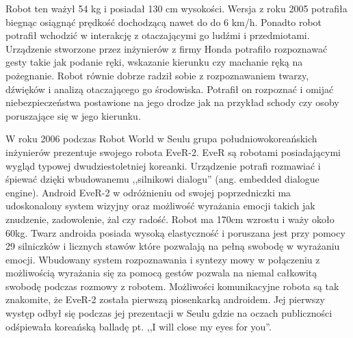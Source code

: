 Robot ten ważył 54 kg i posiadał 130 cm wysokości. Wersja z roku 2005 potrafiła
biegnąc osiągnąć prędkość dochodzącą nawet do do 6 km/h. Ponadto robot potrafił
wchodzić w interakcję z otaczającymi go ludźmi i przedmiotami. Urządzenie
stworzone przez inżynierów z firmy Honda potrafiło rozpoznawać gesty takie jak
podanie ręki, wskazanie kierunku czy machanie ręką na pożegnanie. Robot równie
dobrze radził sobie z rozpoznawaniem twarzy, dźwięków i analizą otaczającego go
środowiska. Potrafił on rozpoznać i omijać niebezpieczeństwa postawione na jego
drodze jak na przykład schody czy osoby poruszające się w jego kierunku.

W roku 2006 podczas Robot World w Seulu grupa południowokoreańskich inżynierów
prezentuje swojego robota EveR-2. EveR są robotami posiadającymi wygląd typowej
dwudziestoletniej koreanki. Urządzenie potrafi rozmawiać i śpiewać dzięki
wbudowanemu ,,silnikowi dialogu'' (ang. embedded dialogue engine). Android
EveR-2 w odróżnieniu od swojej poprzedniczki ma udoskonalony system wizyjny
oraz możliwość wyrażania emocji takich jak znudzenie, zadowolenie, żal czy radość.
Robot ma 170cm wzrostu i waży około 60kg. Twarz androida posiada wysoką
elastyczność i poruszana jest przy pomocy 29 silniczków i licznych stawów
które pozwalają na pełną swobodę w wyrażaniu emocji. Wbudowany system
rozpoznawania i syntezy mowy w połączeniu z możliwością wyrażania się za pomocą
gestów pozwala na niemal całkowitą swobodę podczas rozmowy z robotem. Możliwości
komunikacyjne robota są tak znakomite, że EveR-2 została pierwszą piosenkarką
androidem. Jej pierwszy występ odbył się podczas jej prezentacji w Seulu gdzie
na oczach publiczności odśpiewała koreańską balladę pt. ,,I will close my eyes
for you''.


